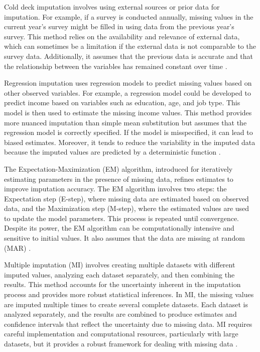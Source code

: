 Cold deck imputation involves using external sources or prior data for imputation. For example, if a survey is conducted annually, missing values in the current year's survey might be filled in using data from the previous year's survey. This method relies on the availability and relevance of external data, which can sometimes be a limitation if the external data is not comparable to the survey data. Additionally, it assumes that the previous data is accurate and that the relationship between the variables has remained constant over time \cite{little2019statistical}.

Regression imputation uses regression models to predict missing values based on other observed variables. For example, a regression model could be developed to predict income based on variables such as education, age, and job type. This model is then used to estimate the missing income values. This method provides more nuanced imputation than simple mean substitution but assumes that the regression model is correctly specified. If the model is misspecified, it can lead to biased estimates. Moreover, it tends to reduce the variability in the imputed data because the imputed values are predicted by a deterministic function \cite{kang2013prevention}.

The Expectation-Maximization (EM) algorithm, introduced for iteratively estimating parameters in the presence of missing data, refines estimates to improve imputation accuracy. The EM algorithm involves two steps: the Expectation step (E-step), where missing data are estimated based on observed data, and the Maximization step (M-step), where the estimated values are used to update the model parameters. This process is repeated until convergence. Despite its power, the EM algorithm can be computationally intensive and sensitive to initial values. It also assumes that the data are missing at random (MAR) \cite{dempster1977maximum}.

Multiple imputation (MI) involves creating multiple datasets with different imputed values, analyzing each dataset separately, and then combining the results. This method accounts for the uncertainty inherent in the imputation process and provides more robust statistical inferences. In MI, the missing values are imputed multiple times to create several complete datasets. Each dataset is analyzed separately, and the results are combined to produce estimates and confidence intervals that reflect the uncertainty due to missing data. MI requires careful implementation and computational resources, particularly with large datasets, but it provides a robust framework for dealing with missing data \cite{li2015multiple}.

